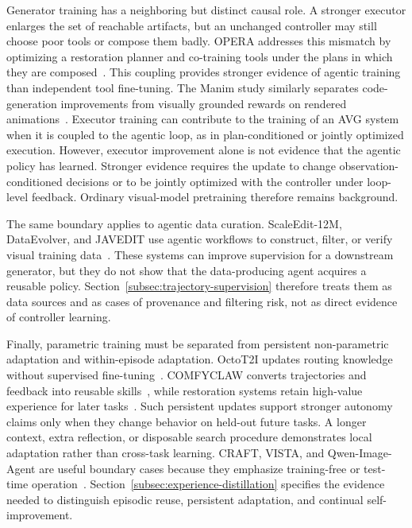 Generator training has a neighboring but distinct causal role. A stronger executor enlarges the set of reachable artifacts, but an unchanged controller may still choose poor tools or compose them badly. OPERA addresses this mismatch by optimizing a restoration planner and co-training tools under the plans in which they are composed~\cite{avg260522104}. This coupling provides stronger evidence of agentic training than independent tool fine-tuning. The Manim study similarly separates code-generation improvements from visually grounded rewards on rendered animations~\cite{avg260418364}. Executor training can contribute to the training of an AVG system when it is coupled to the agentic loop, as in plan-conditioned or jointly optimized execution. However, executor improvement alone is not evidence that the agentic policy has learned. Stronger evidence requires the update to change observation-conditioned decisions or to be jointly optimized with the controller under loop-level feedback. Ordinary visual-model pretraining therefore remains background.

The same boundary applies to agentic data curation. ScaleEdit-12M, DataEvolver, and JAVEDIT use agentic workflows to construct, filter, or verify visual training data~\cite{avg260320644,avg260603168,avg260631537}. These systems can improve supervision for a downstream generator, but they do not show that the data-producing agent acquires a reusable policy. Section~\ref{subsec:trajectory-supervision} therefore treats them as data sources and as cases of provenance and filtering risk, not as direct evidence of controller learning.

Finally, parametric training must be separated from persistent non-parametric adaptation and within-episode adaptation. OctoT2I updates routing knowledge without supervised fine-tuning~\cite{jiang2026octot2i}. COMFYCLAW converts trajectories and feedback into reusable skills~\cite{avg260701709}, while restoration systems retain high-value experience for later tasks~\cite{avg260628971,avg260202051,avg260522208}. Such persistent updates support stronger autonomy claims only when they change behavior on held-out future tasks. A longer context, extra reflection, or disposable search procedure demonstrates local adaptation rather than cross-task learning. CRAFT, VISTA, and Qwen-Image-Agent are useful boundary cases because they emphasize training-free or test-time operation~\cite{kovalev2025craft,long2026vista,avg260626907}. Section~\ref{subsec:experience-distillation} specifies the evidence needed to distinguish episodic reuse, persistent adaptation, and continual self-improvement.

